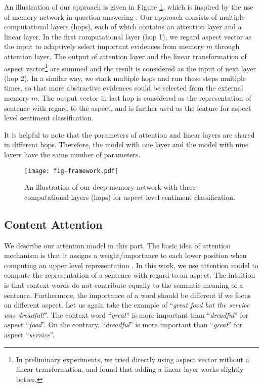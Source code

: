 \documentclass[11pt,letterpaper]{article}
\begin{document}
An illustration of our approach is given in Figure \ref{fig:framework}, which is inspired by the use of memory network in question answering \cite{Sukhbaatar2015end}.
Our approach consists of multiple computational layers (hops), each of which contains an attention layer and a linear layer. 
In the first computational layer (hop 1), we regard aspect vector as the input to adaptively select important evidences from memory $m$ through attention layer. 
The output of attention layer and the linear transformation of aspect vector\footnote{In preliminary experiments, we tried directly using aspect vector without a linear transformation, and found that adding a linear layer works slightly better.} are summed and the result is considered as the input of next layer (hop 2). 
In a similar way, we stack multiple hops and run these steps multiple times, so that more abstractive evidences could be selected from the external memory $m$. 
The output vector in last hop is considered as the representation of sentence with regard to the aspect, and is further used as the feature for aspect level sentiment classification. 

It is helpful to note that the parameters of attention and linear layers are shared in different hops. 
Therefore, the model with one layer and the model with nine layers have the same number of parameters.

\begin{figure}[t]
	\centering
	\texttt{[image: fig-framework.pdf]}
	\caption{An illustration of our deep memory network with three computational layers (hops) for aspect level sentiment classification.}
	\label{fig:framework}
\end{figure}

\subsection{Content Attention}
We describe our attention model in this part.
The basic idea of attention mechanism is that it assigns a weight/importance to each lower position when computing an upper level representation \cite{Bahdanau2015}.
In this work, we use attention model to compute the representation of a sentence with regard to an aspect. 
The intuition is that context words do not contribute equally to the semantic meaning of a sentence. 
Furthermore, the importance of a word should be different if we focus on different aspect.
Let us again take the example of  ``\textit{great food but the service was dreadful!}''. 
The context word ``\textit{great}'' is more important than ``\textit{dreadful}'' for aspect ``\textit{food}''.
On the contrary, ``\textit{dreadful}'' is more important than ``\textit{great}'' for aspect ``\textit{service}''.
\end{document}
